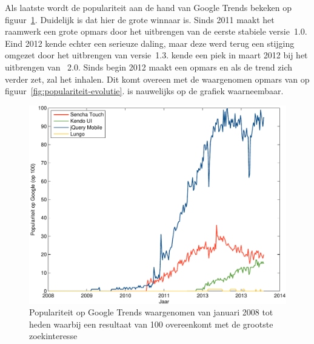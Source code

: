 Als laatste wordt de populariteit aan de hand van Google Trends bekeken op figuur~\ref{fig:google-trends}.
Duidelijk is dat hier \jqm{} de grote winnaar is.
Sinds 2011 maakt het raamwerk een grote opmars door het uitbrengen van de eerste stabiele versie~1.0.
Eind 2012 kende \jqm{} echter een serieuze daling, maar deze werd terug een stijging omgezet door het uitbrengen van versie~1.3. 
\st{} kende een piek in maart 2012 bij het uitbrengen van \st{}~2.0.
Sinds begin 2012 maakt \kendo{} een opmars en als de trend zich verder zet, zal het \st{} inhalen.
Dit komt overeen met de waargenomen opmars van \kendo{} op figuur~\ref{fig:populariteit-evolutie}.
\lungo{} is nauwelijks op de grafiek waarneembaar.

\begin{figure}[H]
  \centering
  \includegraphics[width=\textwidth]{figuren/google-trends.pdf}
  \caption{Populariteit op Google Trends waargenomen van januari 2008 tot heden waarbij een resultaat van 100 overeenkomt met de grootste zoekinteresse~\cite{Google2012a}}
  \label{fig:google-trends}
\end{figure}